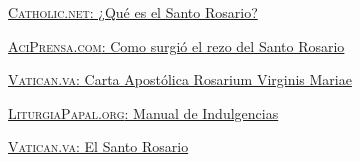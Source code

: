 \documentclass[12pt, letterpaper]{report}
\begin{document}
    
    \begin{thebibliography}{0}
       \href{http://www.rosario.catholic.net/index.php}{\textsc{Catholic.net}: ¿Qué es el Santo Rosario?}
      
       \href{https://www.aciprensa.com/Rosario/surgio.htm}{\textsc{AciPrensa.com}: Como surgió el rezo del Santo Rosario}

       \href{https://www.vatican.va/content/john-paul-ii/es/apost_letters/2002/documents/hf_jp-ii_apl_20021016_rosarium-virginis-mariae.html}{\textsc{Vatican.va}: Carta Apostólica Rosarium Virginis Mariae}

       \href{https://liturgiapapal.org/attachments/article/1076/Indulgencias.pdf}{\textsc{LiturgiaPapal.org}: Manual de Indulgencias}
 
       \href{https://www.vatican.va/special/rosary/index_rosary_sp.htm}{\textsc{Vatican.va}: El Santo Rosario}

    \end{thebibliography}
\end{document}
